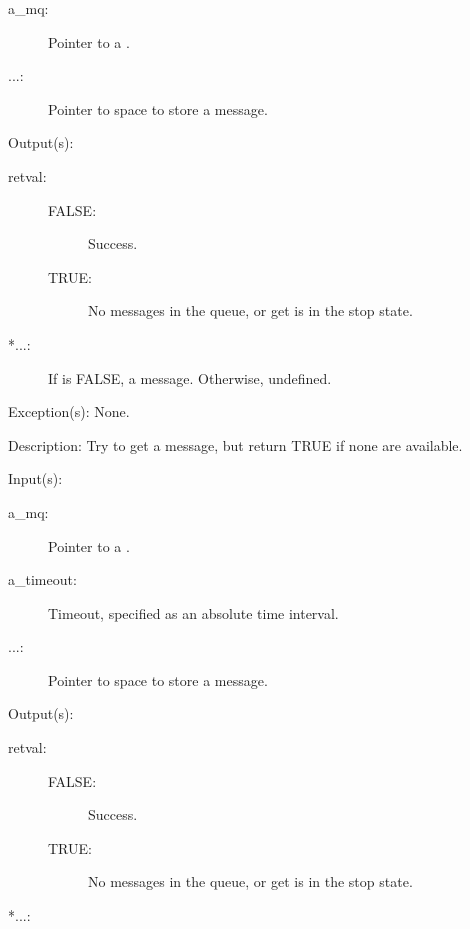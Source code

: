\begin{capi}
\begin{capilist}
\begin{description}
		\item[a\_mq: ]
			Pointer to a .
		\item[...: ]
			Pointer to space to store a message.
		\end{description}
	\item[Output(s): ]
		\begin{description}\item[]
		\item[retval: ]
			\begin{description}\item[]
			\item[FALSE: ] Success.
			\item[TRUE: ] No messages in the queue, or get is
				in the stop state.
			\end{description}
		\item[*...: ]
			If  is FALSE, a message.  Otherwise,
			undefined.
		\end{description}
	\item[Exception(s): ] None.
	\item[Description: ]
		Try to get a message, but return TRUE if none are available.
	\end{capilist}
\label{mq_timedget}
	\begin{capilist}
	\item[Input(s): ]
		\begin{description}\item[]
		\item[a\_mq: ]
			Pointer to a .
		\item[a\_timeout: ]
			Timeout, specified as an absolute time interval.
		\item[...: ]
			Pointer to space to store a message.
		\end{description}
	\item[Output(s): ]
		\begin{description}\item[]
		\item[retval: ]
			\begin{description}\item[]
			\item[FALSE: ] Success.
			\item[TRUE: ] No messages in the queue, or get is
				in the stop state.
			\end{description}
		\item[*...: ]

\end{description}
\end{capilist}
\end{capi}
